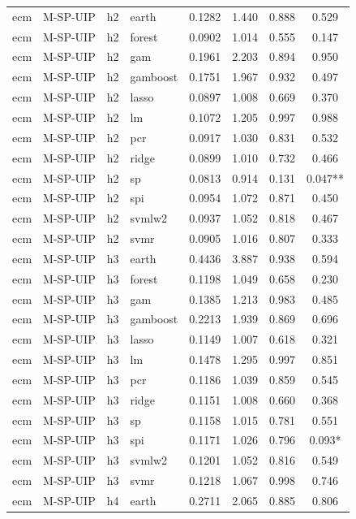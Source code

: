\begin{ThreePartTable}
\begin{longtable}[t]{llclcccc}
\addlinespace
ecm & M-SP-UIP & h2 & earth & 0.1282 & 1.440 & 0.888 & 0.529\\
ecm & M-SP-UIP & h2 & forest & 0.0902 & 1.014 & 0.555 & 0.147\\
ecm & M-SP-UIP & h2 & gam & 0.1961 & 2.203 & 0.894 & 0.950\\
ecm & M-SP-UIP & h2 & gamboost & 0.1751 & 1.967 & 0.932 & 0.497\\
ecm & M-SP-UIP & h2 & lasso & 0.0897 & 1.008 & 0.669 & 0.370\\
ecm & M-SP-UIP & h2 & lm & 0.1072 & 1.205 & 0.997 & 0.988\\
ecm & M-SP-UIP & h2 & pcr & 0.0917 & 1.030 & 0.831 & 0.532\\
ecm & M-SP-UIP & h2 & ridge & 0.0899 & 1.010 & 0.732 & 0.466\\
ecm & M-SP-UIP & h2 & sp & 0.0813 & 0.914 & 0.131 & 0.047**\\
ecm & M-SP-UIP & h2 & spi & 0.0954 & 1.072 & 0.871 & 0.450\\
ecm & M-SP-UIP & h2 & svmlw2 & 0.0937 & 1.052 & 0.818 & 0.467\\
ecm & M-SP-UIP & h2 & svmr & 0.0905 & 1.016 & 0.807 & 0.333\\
\addlinespace
ecm & M-SP-UIP & h3 & earth & 0.4436 & 3.887 & 0.938 & 0.594\\
ecm & M-SP-UIP & h3 & forest & 0.1198 & 1.049 & 0.658 & 0.230\\
ecm & M-SP-UIP & h3 & gam & 0.1385 & 1.213 & 0.983 & 0.485\\
ecm & M-SP-UIP & h3 & gamboost & 0.2213 & 1.939 & 0.869 & 0.696\\
ecm & M-SP-UIP & h3 & lasso & 0.1149 & 1.007 & 0.618 & 0.321\\
ecm & M-SP-UIP & h3 & lm & 0.1478 & 1.295 & 0.997 & 0.851\\
ecm & M-SP-UIP & h3 & pcr & 0.1186 & 1.039 & 0.859 & 0.545\\
ecm & M-SP-UIP & h3 & ridge & 0.1151 & 1.008 & 0.660 & 0.368\\
ecm & M-SP-UIP & h3 & sp & 0.1158 & 1.015 & 0.781 & 0.551\\
ecm & M-SP-UIP & h3 & spi & 0.1171 & 1.026 & 0.796 & 0.093*\\
ecm & M-SP-UIP & h3 & svmlw2 & 0.1201 & 1.052 & 0.816 & 0.549\\
ecm & M-SP-UIP & h3 & svmr & 0.1218 & 1.067 & 0.998 & 0.746\\
\addlinespace
ecm & M-SP-UIP & h4 & earth & 0.2711 & 2.065 & 0.885 & 0.806\\

\end{longtable}
\end{ThreePartTable}
